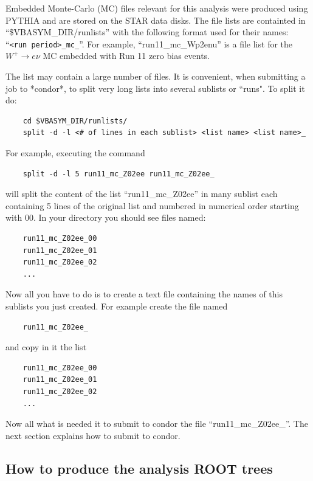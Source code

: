 \documentclass[12pt]{article}
\begin{document}
Embedded Monte-Carlo (MC) files relevant for this analysis were produced using PYTHIA
and are stored on the STAR data disks. The file lists are containted in
``\$VBASYM\_DIR/runlists'' with the following format used for their names: ``\texttt{<run
period>\_mc\_<process type>}''. For example, ``run11\_mc\_Wp2enu'' is a file list for
the $W^{+}\rightarrow e\nu$ MC embedded with Run 11 zero bias events.

The list may contain a large number of files. It is convenient, when submitting
a job to *condor*, to split very long lists into several sublists or ``runs". To
split it do:

\begin{lstlisting}
    cd $VBASYM_DIR/runlists/
    split -d -l <# of lines in each sublist> <list name> <list name>_
\end{lstlisting}

For example, executing the command

\begin{lstlisting}
    split -d -l 5 run11_mc_Z02ee run11_mc_Z02ee_
\end{lstlisting}

will split the content of the list ``run11\_mc\_Z02ee'' in many sublist each
containing 5 lines of the original list and numbered in numerical order starting
with 00. In your directory you should see files named:

\begin{lstlisting}
    run11_mc_Z02ee_00
    run11_mc_Z02ee_01
    run11_mc_Z02ee_02
    ...
\end{lstlisting}

Now all you have to do is to create a text file containing the names of this
sublists you just created. For example create the file named

\begin{lstlisting}
    run11_mc_Z02ee_
\end{lstlisting}

and copy in it the list

\begin{lstlisting}
    run11_mc_Z02ee_00
    run11_mc_Z02ee_01
    run11_mc_Z02ee_02
    ...
\end{lstlisting}

Now all what is needed it to submit to condor the file ``run11\_mc\_Z02ee\_''. The
next section explains how to submit to condor.


\subsection{How to produce the analysis ROOT trees}
\end{document}
